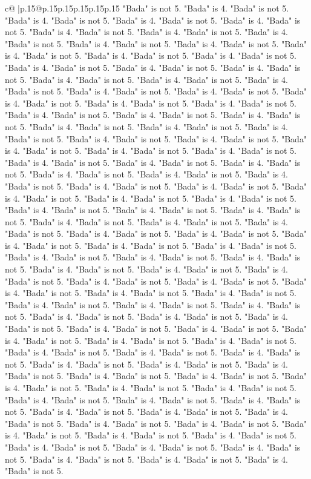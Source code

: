 \documentclass{article}
\begin{document}
{\begin{supertabular}{c@{$\;$}|p{.15\linewidth}@{}p{.15\linewidth}p{.15\linewidth}p{.15\linewidth}p{.15\linewidth}p{.15\linewidth}}
{{{"Bada" is not 5. "Bada" is 4. "Bada" is not 5. "Bada" is 4. "Bada" is not 5. "Bada" is 4. "Bada" is not 5. "Bada" is 4. "Bada" is not 5. "Bada" is 4. "Bada" is not 5. "Bada" is 4. "Bada" is not 5. "Bada" is 4. "Bada" is not 5. "Bada" is 4. "Bada" is not 5. "Bada" is 4. "Bada" is not 5. "Bada" is 4. "Bada" is not 5. "Bada" is 4. "Bada" is not 5. "Bada" is 4. "Bada" is not 5. "Bada" is 4. "Bada" is not 5. "Bada" is 4. "Bada" is not 5. "Bada" is 4. "Bada" is not 5. "Bada" is 4. "Bada" is not 5. "Bada" is 4. "Bada" is not 5. "Bada" is 4. "Bada" is not 5. "Bada" is 4. "Bada" is not 5. "Bada" is 4. "Bada" is not 5. "Bada" is 4. "Bada" is not 5. "Bada" is 4. "Bada" is not 5. "Bada" is 4. "Bada" is not 5. "Bada" is 4. "Bada" is not 5. "Bada" is 4. "Bada" is not 5. "Bada" is 4. "Bada" is not 5. "Bada" is 4. "Bada" is not 5. "Bada" is 4. "Bada" is not 5. "Bada" is 4. "Bada" is not 5. "Bada" is 4. "Bada" is not 5. "Bada" is 4. "Bada" is not 5. "Bada" is 4. "Bada" is not 5. "Bada" is 4. "Bada" is not 5. "Bada" is 4. "Bada" is not 5. "Bada" is 4. "Bada" is not 5. "Bada" is 4. "Bada" is not 5. "Bada" is 4. "Bada" is not 5. "Bada" is 4. "Bada" is not 5. "Bada" is 4. "Bada" is not 5. "Bada" is 4. "Bada" is not 5. "Bada" is 4. "Bada" is not 5. "Bada" is 4. "Bada" is not 5. "Bada" is 4. "Bada" is not 5. "Bada" is 4. "Bada" is not 5. "Bada" is 4. "Bada" is not 5. "Bada" is 4. "Bada" is not 5. "Bada" is 4. "Bada" is not 5. "Bada" is 4. "Bada" is not 5. "Bada" is 4. "Bada" is not 5. "Bada" is 4. "Bada" is not 5. "Bada" is 4. "Bada" is not 5. "Bada" is 4. "Bada" is not 5. "Bada" is 4. "Bada" is not 5. "Bada" is 4. "Bada" is not 5. "Bada" is 4. "Bada" is not 5. "Bada" is 4. "Bada" is not 5. "Bada" is 4. "Bada" is not 5. "Bada" is 4. "Bada" is not 5. "Bada" is 4. "Bada" is not 5. "Bada" is 4. "Bada" is not 5. "Bada" is 4. "Bada" is not 5. "Bada" is 4. "Bada" is not 5. "Bada" is 4. "Bada" is not 5. "Bada" is 4. "Bada" is not 5. "Bada" is 4. "Bada" is not 5. "Bada" is 4. "Bada" is not 5. "Bada" is 4. "Bada" is not 5. "Bada" is 4. "Bada" is not 5. "Bada" is 4. "Bada" is not 5. "Bada" is 4. "Bada" is not 5. "Bada" is 4. "Bada" is not 5. "Bada" is 4. "Bada" is not 5. "Bada" is 4. "Bada" is not 5. "Bada" is 4. "Bada" is not 5. "Bada" is 4. "Bada" is not 5. "Bada" is 4. "Bada" is not 5. "Bada" is 4. "Bada" is not 5. "Bada" is 4. "Bada" is not 5. "Bada" is 4. "Bada" is not 5. "Bada" is 4. "Bada" is not 5. "Bada" is 4. "Bada" is not 5. "Bada" is 4. "Bada" is not 5. "Bada" is 4. "Bada" is not 5. "Bada" is 4. "Bada" is not 5. "Bada" is 4. "Bada" is not 5. "Bada" is 4. "Bada" is not 5. "Bada" is 4. "Bada" is not 5. "Bada" is 4. "Bada" is not 5. "Bada" is 4. "Bada" is not 5. "Bada" is 4. "Bada" is not 5. "Bada" is 4. "Bada" is not 5. "Bada" is 4. "Bada" is not 5. "Bada" is 4. "Bada" is not 5. "Bada" is 4. "Bada" is not 5. "Bada" is 4. "Bada" is not 5. "Bada" is 4. "Bada" is not 5. "Bada" is 4. "Bada" is not 5. "Bada" is 4. "Bada" is not 5. "Bada" is 4. "Bada" is not 5. "Bada" is 4. "Bada" is not 5. "Bada" is 4. "Bada" is not 5. "Bada" is 4. "Bada" is not 5. "Bada" is 4. "Bada" is not 5. "Bada" is 4. "Bada" is not 5. "Bada" is 4. "Bada" is not 5. "Bada" is 4. "Bada" is not 5. }}}
\end{supertabular}}
\end{document}

